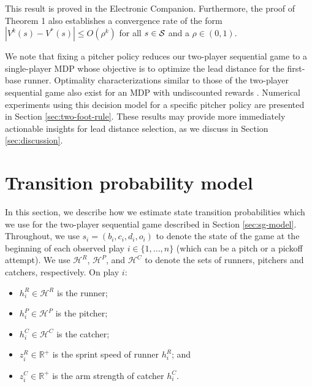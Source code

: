 \documentclass[opre,dblanonrev]{informs4}
\newcommand{\abs}[1]{\left\lvert#1\right\rvert}
\begin{document}
   \noindent This result is proved in the Electronic Companion. Furthermore, the proof of Theorem 1 also establishes a convergence rate of the form $\abs{V^k(s) - V^*(s)} \leq O(\rho^k)$ for all $s \in {\cal S}$ and a $\rho \in (0,1)$.
   
    We note that fixing a pitcher policy reduces our two-player sequential game to a single-player MDP whose objective is to optimize the lead distance for the first-base runner. Optimality characterizations similar to those of the two-player sequential game also exist for an MDP with undiscounted rewards \citep[Section 7.2]{bertsekas_dynamic_2012}. Numerical experiments using this decision  model for a specific pitcher policy are presented in Section \ref{sec:two-foot-rule}. These results may provide more immediately actionable insights for lead distance selection, as we discuss in Section \ref{sec:discussion}.

  \section{Transition probability model}
  \label{sec:transition-probability-model}

    In this section, we describe how we estimate state transition probabilities which we use for the two-player sequential game described in Section \ref{sec:sg-model}. Throughout, we use $s_i = (b_i, c_i, d_i, o_i)$ to denote the state of the game at the beginning of each observed play $i \in \{1, ..., n\}$ (which can be a pitch or a pickoff attempt). We use $\mathcal{H}^R$, $\mathcal{H}^P$, and $\mathcal{H}^C$ to denote the sets of runners, pitchers and catchers, respectively. On play $i$:
    \begin{itemize}
      \item $h_i^R \in \mathcal{H}^R$ is the runner;
      \item $h_i^P \in \mathcal{H}^P$ is the pitcher;
      \item $h_i^C \in \mathcal{H}^C$ is the catcher;
      \item $z_i^R \in \mathbb{R^+}$ is the sprint speed of runner $h_i^R$; and
      \item $z_i^C \in \mathbb{R^+}$ is the arm strength of catcher $h_i^C$.
    \end{itemize}
    
\end{document}

